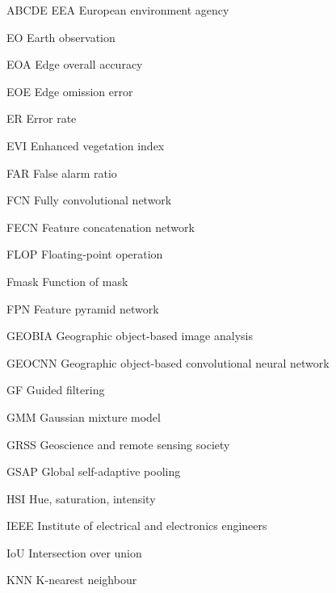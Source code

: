\begin{seznamzkratek}{ABCDE}
	      {EEA}
	      {\qquad European environment agency}

	      {EO}
	      {\qquad Earth observation}

	      {EOA}
	      {\qquad Edge overall accuracy}

	      {EOE}
	      {\qquad Edge omission error}

	      {ER}
	      {\qquad Error rate}

	      {EVI}
	      {\qquad Enhanced vegetation index}

	      {FAR}
	      {\qquad False alarm ratio}

	      {FCN}
	      {\qquad Fully convolutional network}

	      {FECN}
	      {\qquad Feature concatenation network}

	      {FLOP}
	      {\qquad Floating-point operation}

	      {Fmask}
	      {\qquad Function of mask}

	      {FPN}
	      {\qquad Feature pyramid network}

	      {GEOBIA}
	      {\quad \hspace{1mm} Geographic object-based image analysis}

	      {GEOCNN}
	      {\hspace{3.6mm} Geographic object-based convolutional neural network}

	      {GF}
	      {\qquad Guided filtering}

	      {GMM}
	      {\qquad Gaussian mixture model}

	      {GRSS}
	      {\qquad Geoscience and remote sensing society}

	      {GSAP}
	      {\qquad Global self-adaptive pooling}

	      {HSI}
	      {\qquad Hue, saturation, intensity}

	      {IEEE}
	      {\qquad Institute of electrical and electronics engineers}

	      {IoU}
	      {\qquad Intersection over union}

	      {KNN}
	      {\qquad K-nearest neighbour}


\end{seznamzkratek}
